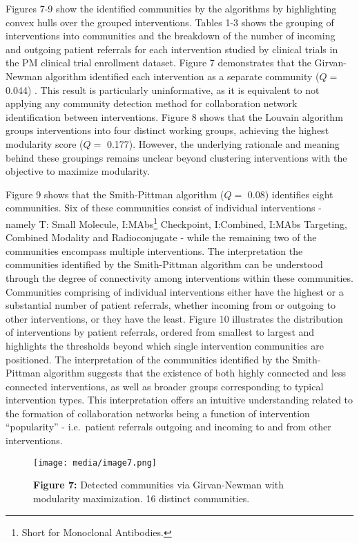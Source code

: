 Figures 7-9 show the identified communities by the algorithms by
highlighting convex hulls over the grouped interventions. Tables 1-3
shows the grouping of interventions into communities and the breakdown
of the number of incoming and outgoing patient referrals for each
intervention studied by clinical trials in the PM clinical trial
enrollment dataset. Figure 7 demonstrates that the Girvan-Newman
algorithm identified each intervention as a separate community (\(Q =\)
0.044) . This result is particularly uninformative, as it is equivalent
to not applying any community detection method for collaboration network
identification between interventions. Figure 8 shows that the Louvain
algorithm groups interventions into four distinct working groups,
achieving the highest modularity score (\(Q =\) 0.177). However, the
underlying rationale and meaning behind these groupings remains unclear
beyond clustering interventions with the objective to maximize
modularity.

Figure 9 shows that the Smith-Pittman algorithm (\(Q =\) 0.08)
identifies eight communities. Six of these communities consist of
individual interventions - namely T: Small Molecule, I:MAbs\footnote{Short
  for Monoclonal Antibodies.} Checkpoint, I:Combined, I:MAbs Targeting,
Combined Modality and Radioconjugate - while the remaining two of the
communities encompass multiple interventions. The interpretation the
communities identified by the Smith-Pittman algorithm can be understood
through the degree of connectivity among interventions within these
communities. Communities comprising of individual interventions either
have the highest or a substantial number of patient referrals, whether
incoming from or outgoing to other interventions, or they have the
least. Figure 10 illustrates the distribution of interventions by
patient referrals, ordered from smallest to largest and highlights the
thresholds beyond which single intervention communities are positioned.
The interpretation of the communities identified by the Smith-Pittman
algorithm suggests that the existence of both highly connected and less
connected interventions, as well as broader groups corresponding to
typical intervention types. This interpretation offers an intuitive
understanding related to the formation of collaboration networks being a
function of intervention ``popularity'' - i.e.~patient referrals
outgoing and incoming to and from other interventions.

\begin{figure}
\centering
\texttt{[image: media/image7.png]}
\caption{\textbf{Figure 7:} Detected communities via Girvan-Newman with
modularity maximization. 16 distinct communities.}
\end{figure}

